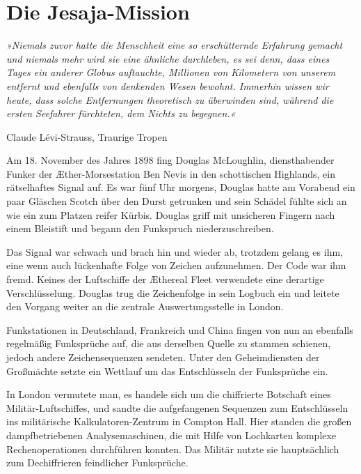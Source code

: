 \section{Die Jesaja-Mission}

\textit{»Niemals zuvor hatte die Menschheit eine so erschütternde Erfahrung
gemacht und niemals mehr wird sie eine ähnliche durchleben, es sei
denn, dass eines Tages ein anderer Globus auftauchte, Millionen von
Kilometern von unserem entfernt und ebenfalls von denkenden Wesen
bewohnt. Immerhin wissen wir heute, dass solche Entfernungen
theoretisch zu überwinden sind, während die ersten Seefahrer
fürchteten, dem Nichts zu begegnen.«
}

\begin{flushright}
Claude Lévi-Strauss, Traurige Tropen
\end{flushright}

\bigpar

Am 18. November des Jahres 1898 fing Douglas McLoughlin,
diensthabender Funker der Æther-Morsestation Ben Nevis in den
schottischen Highlands, ein rätselhaftes Signal auf. Es war fünf
Uhr morgens, Douglas hatte am Vorabend ein paar Gläschen Scotch
über den Durst getrunken und sein Schädel fühlte sich an wie ein
zum Platzen reifer Kürbis. Douglas griff mit unsicheren Fingern
nach einem Bleistift und begann den Funkspruch niederzuschreiben.

Das Signal war schwach und brach hin und wieder ab, trotzdem gelang
es ihm, eine wenn auch lückenhafte Folge von Zeichen aufzunehmen.
Der Code war ihm fremd. Keines der Luftschiffe der Æthereal Fleet
verwendete eine derartige Verschlüsselung. Douglas trug die
Zeichenfolge in sein Logbuch ein und leitete den Vorgang weiter an
die zentrale Auswertungsstelle in London.

\bigpar

Funkstationen in Deutschland, Frankreich und China fingen von nun
an ebenfalls regelmäßig Funksprüche auf, die aus derselben Quelle
zu stammen schienen, jedoch andere Zeichensequenzen sendeten. Unter
den Geheimdiensten der Großmächte setzte ein Wettlauf um das
Entschlüsseln der Funksprüche ein.

\bigpar

In London vermutete man, es handele sich um die chiffrierte
Botschaft eines Militär-Luftschiffes, und sandte die aufgefangenen
Sequenzen zum Entschlüsseln ins militärische Kalkulatoren-Zentrum
in Compton Hall. Hier standen die großen dampfbetriebenen
Analysemaschinen, die mit Hilfe von Lochkarten komplexe
Rechenoperationen durchführen konnten. Das Militär nutzte sie
hauptsächlich zum Dechiffrieren feindlicher Funksprüche.

